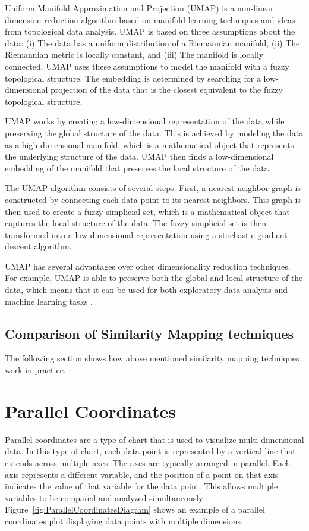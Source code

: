 Uniform Manifold Approximation and Projection (UMAP) is a non-linear
dimension reduction algorithm based on manifold learning techniques and
ideas from topological data analysis. UMAP is based on three assumptions
about the data: (i) The data has a uniform distribution of a Riemannian
manifold, (ii) The Riemannian metric is locally constant, and (iii) The
manifold is locally connected. UMAP uses these assumptions to model the
manifold with a fuzzy topological structure. The embedding is determined
by searching for a low-dimensional projection of the data that is the
closest equivalent to the fuzzy topological structure.

UMAP works by creating a low-dimensional representation of the data while
preserving the global structure of the data. This is achieved by modeling
the data as a high-dimensional manifold, which is a mathematical object
that represents the underlying structure of the data. UMAP then finds a
low-dimensional embedding of the manifold that preserves the local
structure of the data.

The UMAP algorithm consists of several steps. First, a nearest-neighbor
graph is constructed by connecting each data point to its nearest
neighbors. This graph is then used to create a fuzzy simplicial set, which
is a mathematical object that captures the local structure of the data.
The fuzzy simplicial set is then transformed into a low-dimensional
representation using a stochastic gradient descent algorithm.

UMAP has several advantages over other dimensionality reduction
techniques. For example, UMAP is able to preserve both the global and
local structure of the data, which means that it can be used for both
exploratory data analysis and machine learning tasks
\parencite{mcinnes2018umap}.


\subsection{Comparison of Similarity Mapping techniques}

The following section shows how above mentioned similarity mapping
techniques work in practice.




\section{Parallel Coordinates}

Parallel coordinates are a type of chart that is used to visualize
multi-dimensional data. In this type of chart, each data point is
represented by a vertical line that extends across multiple axes. The axes
are typically arranged in parallel. Each axis represents a different
variable, and the position of a point on that axis indicates the value of
that variable for the data point. This allows multiple variables to be
compared and analyzed simultaneously \parencite{inselberg1990parallel}.
Figure~\ref{fig:ParallelCoordinatesDiagram} shows an example of a parallel
coordinates plot displaying data points with multiple dimensions.

